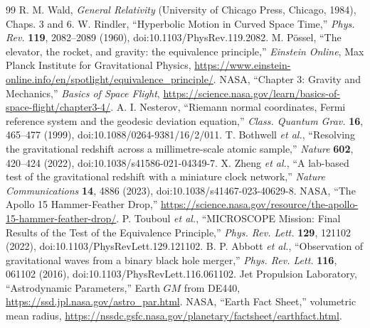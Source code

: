 \documentclass[11pt,letterpaper]{article}
\begin{document}
\clearpage
\begingroup\small
\begin{thebibliography}{99}
 R. M. Wald, \emph{General Relativity} (University of Chicago Press, Chicago, 1984), Chaps. 3 and 6.
 W. Rindler, ``Hyperbolic Motion in Curved Space Time,'' \emph{Phys. Rev.} \textbf{119}, 2082--2089 (1960), doi:10.1103/PhysRev.119.2082.
 M. P\"ossel, ``The elevator, the rocket, and gravity: the equivalence principle,'' \emph{Einstein Online}, Max Planck Institute for Gravitational Physics, \url{https://www.einstein-online.info/en/spotlight/equivalence_principle/}.
 NASA, ``Chapter 3: Gravity and Mechanics,'' \emph{Basics of Space Flight}, \url{https://science.nasa.gov/learn/basics-of-space-flight/chapter3-4/}.
 A. I. Nesterov, ``Riemann normal coordinates, Fermi reference system and the geodesic deviation equation,'' \emph{Class. Quantum Grav.} \textbf{16}, 465--477 (1999), doi:10.1088/0264-9381/16/2/011.
 T. Bothwell \emph{et al.}, ``Resolving the gravitational redshift across a millimetre-scale atomic sample,'' \emph{Nature} \textbf{602}, 420--424 (2022), doi:10.1038/s41586-021-04349-7.
 X. Zheng \emph{et al.}, ``A lab-based test of the gravitational redshift with a miniature clock network,'' \emph{Nature Communications} \textbf{14}, 4886 (2023), doi:10.1038/s41467-023-40629-8.
 NASA, ``The Apollo 15 Hammer-Feather Drop,'' \url{https://science.nasa.gov/resource/the-apollo-15-hammer-feather-drop/}.
 P. Touboul \emph{et al.}, ``MICROSCOPE Mission: Final Results of the Test of the Equivalence Principle,'' \emph{Phys. Rev. Lett.} \textbf{129}, 121102 (2022), doi:10.1103/PhysRevLett.129.121102.
 B. P. Abbott \emph{et al.}, ``Observation of gravitational waves from a binary black hole merger,'' \emph{Phys. Rev. Lett.} \textbf{116}, 061102 (2016), doi:10.1103/PhysRevLett.116.061102.
 Jet Propulsion Laboratory, ``Astrodynamic Parameters,'' Earth $GM$ from DE440, \url{https://ssd.jpl.nasa.gov/astro_par.html}.
 NASA, ``Earth Fact Sheet,'' volumetric mean radius, \url{https://nssdc.gsfc.nasa.gov/planetary/factsheet/earthfact.html}.
\end{thebibliography}
\endgroup
\end{document}
